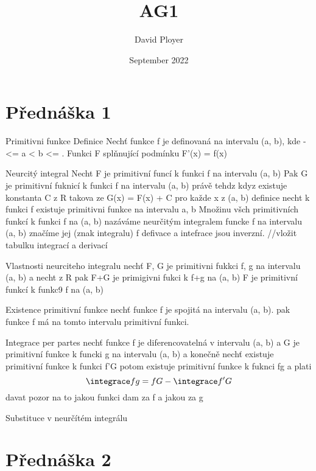 \documentclass{article}
\title{AG1}
\author{David Ployer}
\date{September 2022}
\begin{document}
\maketitle
\section{Přednáška 1}
Primitivni funkce 
	Definice 
		Nechť funkce f je definovaná na intervalu (a, b), kde -\infnt <= a < b <= \infnt . Funkci F splňnující podmínku 
		F'(x) = f(x)

Neurcitý integral 
	Necht F je primitivní funcí k funkci f na intervalu (a, b) Pak G je primitivní fuknicí k funkci f na intervalu (a, b) právě tehdz kdyz existuje konstanta C z R takova ze 
	G(x) = F(x) + C pro každe x z (a, b)
	definice 
		necht k funkci f existuje primitivni funkce na intervalu a, b Množinu všch primitivních funkcí k funkci f na (a, b) nazáváme neurčitým integralem funcke f na intervalu (a, b) značíme jej (znak integralu) f
	defivace a intefrace jsou inverzní.
	//vložit tabulku integrací a derivací

Vlastnosti neurciteho integralu
	nechť F, G je primitivni fukkci f, g na intervalu (a, b) a necht \alpha z R pak 
		F+G je primigivni fukci k f+g na (a, b)
		\alpha F je primitivní funkcí k funkc9 \alpha f na (a, b)
	
Existence primitivní funkce
	nechť funkce f je spojitá na intervalu (a, b). pak funkce f má na tomto intervalu primitivní funkci.

Integrace per partes 
	nechť funkce f je diferencovatelná v intervalu (a, b) a G je primitivní funkce k funcki g na intervalu (a, b) a konečně nechť existuje primitivní funkce k funkci f'G potom existuje primitivní funkce k fuknci fg a plati
$$\integrace fg = fG - \integrace f'G$$
	davat pozor na to jakou funkci dam za f a jakou za g

Substituce v neurčítém integrálu

\section{Přednáška 2}
\end{document}
